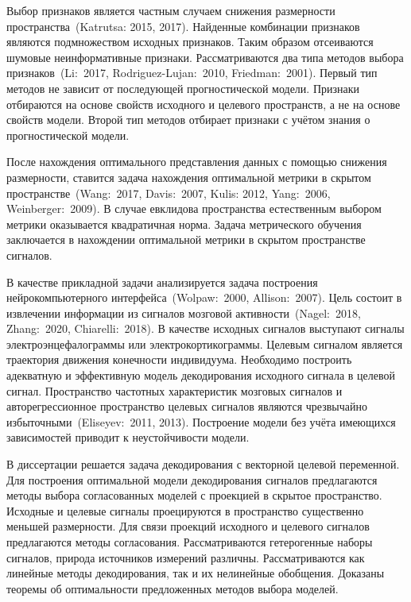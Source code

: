 \documentclass[11pt, a5paper]{dissert}
\begin{document}
Выбор признаков является частным случаем снижения размерности пространства~(Katrutsa: 2015, 2017). 
Найденные комбинации признаков являются подмножеством исходных признаков.
Таким образом отсеиваются шумовые неинформативные признаки.
Рассматриваются два типа методов выбора признаков~(Li:~2017, Rodriguez-Lujan:~2010, Friedman:~2001).
Первый тип методов не зависит от последующей прогностической модели.
Признаки отбираются на основе свойств исходного и целевого пространств, а не на основе свойств модели.
Второй тип методов отбирает признаки с учётом знания о прогностической модели. 

После нахождения оптимального представления данных с помощью снижения размерности, ставится задача нахождения оптимальной метрики в скрытом пространстве~(Wang:~2017, Davis:~2007, Kulis: 2012, Yang:~2006, Weinberger:~2009).
В случае евклидова пространства естественным выбором метрики оказывается квадратичная норма.
Задача метрического обучения заключается в нахождении оптимальной метрики в скрытом пространстве сигналов.

В качестве прикладной задачи анализируется задача построения нейрокомпьютерного интерфейса~(Wolpaw:~2000, Allison:~2007). 
Цель состоит в извлечении информации из сигналов мозговой активности~(Nagel:~2018, Zhang:~2020, Chiarelli:~2018). 
В качестве исходных сигналов выступают сигналы электроэнцефалограммы или электрокортикограммы. 
Целевым сигналом является траектория движения конечности индивидуума.
Необходимо построить адекватную и эффективную модель декодирования исходного сигнала в целевой сигнал.
Пространство частотных характеристик мозговых сигналов и авторегрессионное пространство целевых сигналов являются чрезвычайно избыточными~(Eliseyev:~2011, 2013). 
Построение модели без учёта имеющихся зависимостей приводит к неустойчивости модели.

В диссертации решается задача декодирования с векторной целевой переменной. 
Для построения оптимальной модели декодирования сигналов предлагаются методы выбора согласованных моделей с проекцией в скрытое пространство.
Исходные и целевые сигналы проецируются в пространство существенно меньшей размерности. 
Для связи проекций исходного и целевого сигналов предлагаются методы согласования.
Рассматриваются гетерогенные наборы сигналов, природа источников измерений различны.
Рассматриваются как линейные методы декодирования, так и их нелинейные обобщения.
Доказаны теоремы об оптимальности предложенных методов выбора моделей.
\end{document}
